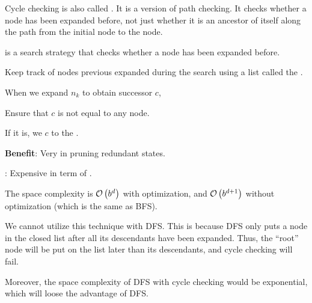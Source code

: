 Cycle checking is also called . It is a  version of path checking. It checks whether a node has been expanded before, not just whether it is an ancestor of itself along the path from the initial node to the node. 

\begin{definition}\label{def:cycle-checking}
     is a search strategy that checks whether a node has been expanded before.
\end{definition}

\begin{listu}
    \item Keep track of  nodes previous expanded during the search using a list called the .
    
    \item When we expand $n_k$ to obtain successor $c$, 
    
    \begin{listu}
        \item Ensure that $c$ is not equal to any  node.
        \item If it is, we  $c$ to the \Frontier. 
    \end{listu}

    \item {\color{darkGreen}\textbf{Benefit}:} Very  in pruning redundant states.
    
    \item {}: Expensive in term of . 
    
    The space complexity is $\mathcal{O}\left(b^{d}\right)$ with optimization, and $\mathcal{O}\left(b^{d+1}\right)$ without optimization (which is the same as BFS).
\end{listu}

\begin{remark}
    We cannot utilize this technique with DFS. This is because DFS only puts a node in the closed list after all its descendants have been expanded. Thus, the ``root'' node will be put on the list later than its descendants, and cycle checking will fail.

    Moreover, the space complexity of DFS with cycle checking would be exponential, which will loose the advantage of DFS.
\end{remark}

